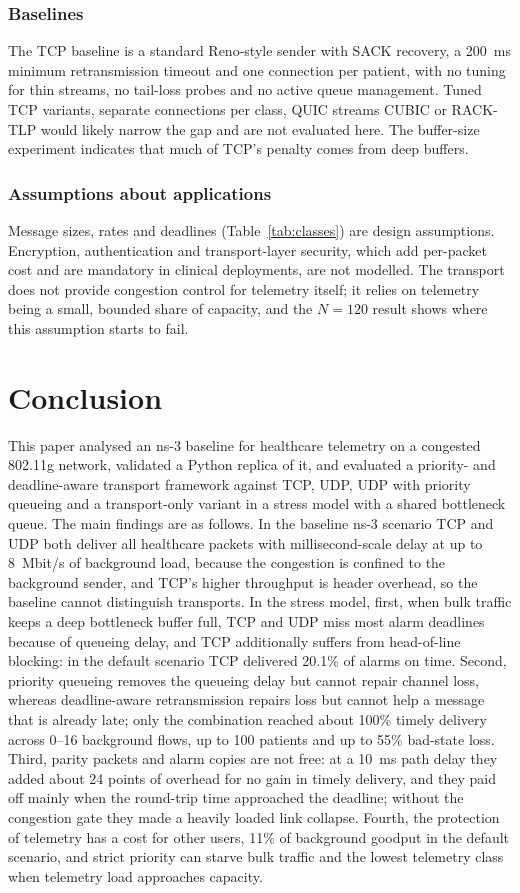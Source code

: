 \documentclass[10pt,twocolumn,letterpaper]{article}
\begin{document}
\subsubsection{Baselines}
The TCP baseline is a standard Reno-style sender with SACK recovery, a 200~ms minimum retransmission timeout and one connection per patient, with no tuning for thin streams, no tail-loss probes and no active queue management. Tuned TCP variants, separate connections per class, QUIC streams \cite{rfc9000} CUBIC \cite{rfc9438} or RACK-TLP \cite{rfc8985} would likely narrow the gap and are not evaluated here. The buffer-size experiment indicates that much of TCP's penalty comes from deep buffers.

\subsubsection{Assumptions about applications}
Message sizes, rates and deadlines (Table~\ref{tab:classes}) are design assumptions. Encryption, authentication and transport-layer security, which add per-packet cost and are mandatory in clinical deployments, are not modelled. The transport does not provide congestion control for telemetry itself; it relies on telemetry being a small, bounded share of capacity, and the $N=120$ result shows where this assumption starts to fail.

\section{Conclusion}
This paper analysed an ns-3 baseline for healthcare telemetry on a congested 802.11g network, validated a Python replica of it, and evaluated a priority- and deadline-aware transport framework against TCP, UDP, UDP with priority queueing and a transport-only variant in a stress model with a shared bottleneck queue. The main findings are as follows. In the baseline ns-3 scenario TCP and UDP both deliver all healthcare packets with millisecond-scale delay at up to 8~Mbit/s of background load, because the congestion is confined to the background sender, and TCP's higher throughput is header overhead, so the baseline cannot distinguish transports. In the stress model, first, when bulk traffic keeps a deep bottleneck buffer full, TCP and UDP miss most alarm deadlines because of queueing delay, and TCP additionally suffers from head-of-line blocking: in the default scenario TCP delivered 20.1\% of alarms on time. Second, priority queueing removes the queueing delay but cannot repair channel loss, whereas deadline-aware retransmission repairs loss but cannot help a message that is already late; only the combination reached about 100\% timely delivery across 0--16 background flows, up to 100 patients and up to 55\% bad-state loss. Third, parity packets and alarm copies are not free: at a 10~ms path delay they added about 24 points of overhead for no gain in timely delivery, and they paid off mainly when the round-trip time approached the deadline; without the congestion gate they made a heavily loaded link collapse. Fourth, the protection of telemetry has a cost for other users, 11\% of background goodput in the default scenario, and strict priority can starve bulk traffic and the lowest telemetry class when telemetry load approaches capacity.
\end{document}
